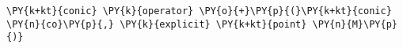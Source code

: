 \begin{Verbatim}[commandchars=\\\{\}]
    \PY{k+kt}{conic} \PY{k}{operator} \PY{o}{+}\PY{p}{(}\PY{k+kt}{conic} \PY{n}{co}\PY{p}{,} \PY{k}{explicit} \PY{k+kt}{point} \PY{n}{M}\PY{p}{)}
\end{Verbatim}
